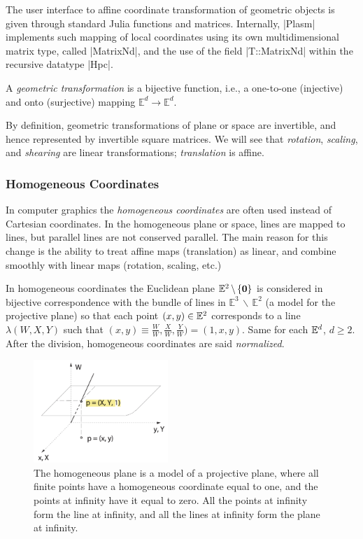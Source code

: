 The user interface to affine coordinate transformation of geometric objects is given through standard Julia functions and matrices. Internally, |Plasm| implements such mapping of local coordinates using its own multidimensional matrix type, called |MatrixNd|, and the use of the field |T::MatrixNd| within the recursive datatype |Hpc|.

\begin{definition}
A \emph{geometric transformation} is a bijective function, i.e., a one-to-one (injective) and onto (surjective) mapping $\mathbb{E}^d \to \mathbb{E}^d$. 
\end{definition}

By definition, geometric transformations of plane or space are invertible, and hence represented by invertible square matrices. We will see that \emph{rotation}, \emph{scaling}, and \emph{shearing} are linear transformations; \emph{translation} is affine. 


\subsubsection*{Homogeneous Coordinates}

In computer graphics the \emph{homogeneous coordinates} are often used instead of Cartesian coordinates. In the homogeneous plane or space, lines are mapped to lines, but parallel lines are not conserved parallel. The main reason for this change is the ability to treat affine maps (translation) as linear, and combine smoothly with linear maps (rotation, scaling, etc.)

In homogeneous coordinates the Euclidean plane $\mathbb{E}^2 \,\backslash\, \{{\mbox{\boldmath $0$}}\}$ is considered in bijective correspondence with the bundle of lines in $\mathbb{E}^3 \,\backslash\, \mathbb{E}^2$ (a model for the projective plane) so that each point $(x,y)\in\mathbb{E}^2$ corresponds to a line $\lambda(W, X, Y)$ such that $(x, y) \equiv \frac{W}{W}, \frac{X}{W}, \frac{Y}{W}) = (1, x, y)$. Same for each $\mathbb{E}^d$, $d \geq 2$. After the division, homogeneous coordinates are said \emph{normalized}.

\begin{figure}[htbp] %
   \sidecaption[t]
   \includegraphics[width=2in]{chapter-04/figs/homog-2d} 
   \caption{The homogeneous plane is a model of a projective plane, where all finite points have a homogeneous coordinate equal to one, and the points at infinity have it equal to zero. All the points at infinity form the line at infinity, and all the lines at infinity form the plane at infinity.}
   \label{fig:example}
\end{figure}

